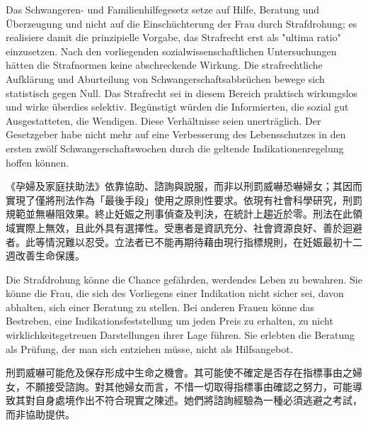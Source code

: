 \documentclass[12pt]{article}
\begin{document}
\begin{sourcepara}[title={原文C.18}]
Das Schwangeren- und Familienhilfegesetz setze auf Hilfe, Beratung und Überzeugung und nicht auf die Einschüchterung der Frau durch Strafdrohung; es realisiere damit die prinzipielle Vorgabe, das Strafrecht erst als "ultima ratio" einzusetzen. Nach den vorliegenden sozialwissenschaftlichen Untersuchungen hätten die Strafnormen keine abschreckende Wirkung. Die strafrechtliche Aufklärung und Aburteilung von Schwangerschaftsabbrüchen bewege sich statistisch gegen Null. Das Strafrecht sei in diesem Bereich praktisch wirkungslos und wirke überdies selektiv. Begünstigt würden die Informierten, die sozial gut Ausgestatteten, die Wendigen. Diese Verhältnisse seien unerträglich. Der Gesetzgeber habe nicht mehr auf eine Verbesserung des Lebensschutzes in den ersten zwölf Schwangerschaftswochen durch die geltende Indikationenregelung hoffen können.
\end{sourcepara}
\begin{transpara}
《孕婦及家庭扶助法》依靠協助、諮詢與說服，而非以刑罰威嚇恐嚇婦女；其因而實現了僅將刑法作為「最後手段」使用之原則性要求。依現有社會科學研究，刑罰規範並無嚇阻效果。終止妊娠之刑事偵查及判決，在統計上趨近於零。刑法在此領域實際上無效，且此外具有選擇性。受惠者是資訊充分、社會資源良好、善於迴避者。此等情況難以忍受。立法者已不能再期待藉由現行指標規則，在妊娠最初十二週改善生命保護。
\end{transpara}

\begin{sourcepara}[title={原文C.19}]
Die Strafdrohung könne die Chance gefährden, werdendes Leben zu bewahren. Sie könne die Frau, die sich des Vorliegens einer Indikation nicht sicher sei, davon abhalten, sich einer Beratung zu stellen. Bei anderen Frauen könne das Bestreben, eine Indikationsfeststellung um jeden Preis zu erhalten, zu nicht wirklichkeitsgetreuen Darstellungen ihrer Lage führen. Sie erlebten die Beratung als Prüfung, der man sich entziehen müsse, nicht als Hilfsangebot.
\end{sourcepara}
\begin{transpara}
刑罰威嚇可能危及保存形成中生命之機會。其可能使不確定是否存在指標事由之婦女，不願接受諮詢。對其他婦女而言，不惜一切取得指標事由確認之努力，可能導致其對自身處境作出不符合現實之陳述。她們將諮詢經驗為一種必須逃避之考試，而非協助提供。
\end{transpara}
\end{document}
